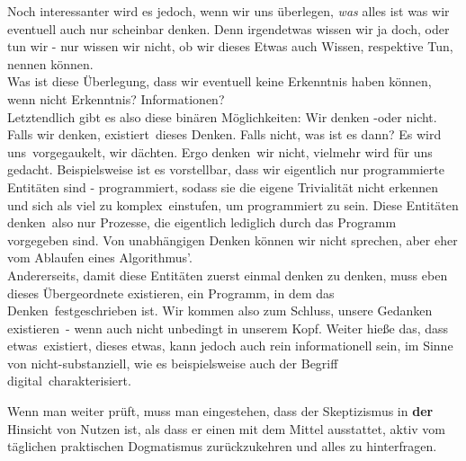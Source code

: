 \documentclass[12pt,a4paper]{article}
\begin{document}
Noch interessanter wird es jedoch, wenn wir uns überlegen, \emph{was} alles ist was wir eventuell auch nur scheinbar denken. Denn irgendetwas wissen wir ja doch, oder tun wir - nur wissen wir nicht, ob wir dieses Etwas auch \glqq Wissen\grqq , respektive \glqq Tun\grqq , nennen können.\\
Was ist diese \glqq Überlegung\grqq , dass wir eventuell keine Erkenntnis haben können, wenn nicht Erkenntnis? Informationen?\\
Letztendlich gibt es also diese binären Möglichkeiten: Wir denken -oder nicht.
Falls wir denken, \glqq existiert\grqq\ dieses Denken. Falls nicht, was ist es dann? Es wird \glqq uns\grqq\ vorgegaukelt, wir dächten. Ergo \glqq denken\grqq\  wir nicht, vielmehr \glqq wird für uns gedacht\grqq . 
Beispielsweise ist es vorstellbar, dass wir eigentlich nur programmierte Entitäten sind - programmiert, sodass sie die eigene Trivialität nicht erkennen und sich als \glqq viel zu komplex\grqq\ einstufen, um programmiert zu sein. Diese Entitäten \glqq denken\grqq\ also nur Prozesse, die eigentlich lediglich durch das Programm vorgegeben sind. Von unabhängigen Denken können wir nicht sprechen, aber eher vom Ablaufen eines Algorithmus'.\\ Andererseits, damit diese Entitäten zuerst einmal \glqq denken zu denken\grqq , muss eben dieses Übergeordnete existieren, ein Programm, in dem das \glqq Denken\grqq\ festgeschrieben ist. Wir kommen also zum Schluss, unsere Gedanken \glqq existieren\grqq\  - wenn auch nicht unbedingt in unserem Kopf. Weiter hieße das, dass \glqq etwas\grqq\ existiert, dieses \glqq etwas\grqq , kann jedoch auch rein informationell sein, im Sinne von nicht-substanziell, wie es beispielsweise auch der Begriff \glqq digital\grqq\ charakterisiert.

Wenn man weiter prüft, muss man eingestehen, dass der Skeptizismus in \textbf{der} Hinsicht von Nutzen ist, als dass er einen mit dem Mittel ausstattet, aktiv vom täglichen praktischen Dogmatismus zurückzukehren und alles zu hinterfragen.
\nolinenumbers
\end{document}
